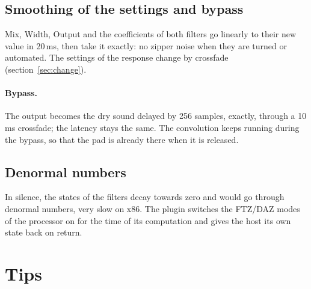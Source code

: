 \documentclass[a4paper,11pt]{article}
\begin{document}
\subsection{Smoothing of the settings and bypass}\label{sec:smoothing}

Mix, Width, Output and the coefficients of both filters go linearly to their new value in 20\,ms,
then take it exactly: no zipper noise when they are turned or automated. The settings of the
response change by crossfade (section~\ref{sec:change}).

\paragraph{Bypass.} The output becomes the dry sound delayed by 256 samples, exactly, through a
10\,ms crossfade; the latency stays the same. The convolution keeps running during the bypass, so
that the pad is already there when it is released.

\subsection{Denormal numbers}

In silence, the states of the filters decay towards zero and would go through denormal numbers,
very slow on x86. The plugin switches the FTZ/DAZ modes of the processor on for the time of its
computation and gives the host its own state back on return.

\section{Tips}
\end{document}
